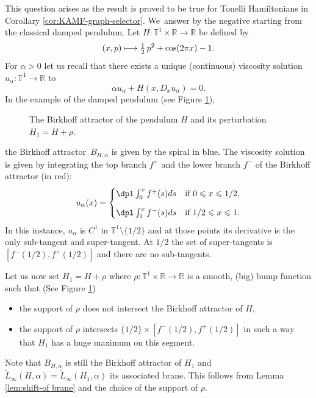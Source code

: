 \documentclass[JEP,XML,SOM,Unicode,NoFloatCountersInSection,published]{cedram}
\newcommand\mto{\mathchoice{\longmapsto}{\mapsto}{\mapsto}{\mapsto}}
\theoremstyle{definition}
\newcommand{\R}{\mathbb{R}}
\begin{document}
\begin{appendix}
This question arises as the result is proved to be true for Tonelli Hamiltonians in Corollary \ref{cor:KAMF-graph-selector}. We~answer by the negative starting from the classical damped pendulum. Let $H: \mathbb T^1\times \R \to \R$ be defined by\vspace*{-3pt}
\[
(x,p)\mto \tfrac12\, p^2 + \cos(2\pi x)-1.
\]
For $\alpha>0$ let us recall that there exists a unique (continuous) viscosity solution $u_\alpha : \mathbb T^1 \to \R$ to\vspace*{-3pt}
\[
\alpha u_\alpha + H(x, D_x u_\alpha) =0.
\]
In the example of the damped pendulum (see Figure \ref{fig:pendulum+perturb}),
\begin{figure}[htb]
\vspace*{5pt}
\def\svgwidth{0.8\textwidth}
\centering
{\small}
\caption{The Birkhoff attractor of the pendulum $H$ and its perturbation $H_1=H+\rho$.}
\label{fig:pendulum+perturb}
\end{figure}
the Birkhoff attractor~$B_{H,\alpha}$ is given by the spiral in blue. The viscosity solution is given by integrating the top branch $f^+$ and the lower branch $f^-$ of the Birkhoff attractor (in red):
\[
u_\alpha (x) = \begin{cases}
\dpl\int_{0}^x f^+(s)ds&\text{if } 0\leqslant x\leqslant 1/2,\\[8pt]
\dpl\int_{1}^x f^-(s)ds&\text{if } 1/2\leqslant x\leqslant 1.
\end{cases}
\]
In this instance, $u_\alpha$ is $C^1$ in $\mathbb T^1 \setminus \{1/2\}$ and at those points its derivative is the only sub-tangent and super-tangent. At $1/2$ the set of super-tangents is $[f^-(1/2), f^+(1/2)]$ and there are no sub-tangents.

Let us now set $H_1 = H+\rho$ where $\rho : \mathbb T^1\times \R \to \R$ is a smooth, (big) bump function such that (See Figure \ref{fig:pendulum+perturb})
\begin{itemize}
\item the support of $\rho$ does not intersect the Birkhoff attractor of $H$,
\item the support of $\rho$ intersects $\{1/2\} \times [f^-(1/2), f^+(1/2)]$ in such a way that $H_1$ has a huge maximum on this segment.
\end{itemize}

Note that $B_{H,\alpha} $ is still the Birkhoff attractor of $H_1$ and $\tilde L_\infty(H,\alpha)=\tilde L_\infty(H_1,\alpha)$ its associated brane. This follows from Lemma \ref{lem:shift-of brane}
and the choice of the support of $\rho$.


\end{appendix}
\end{document}
